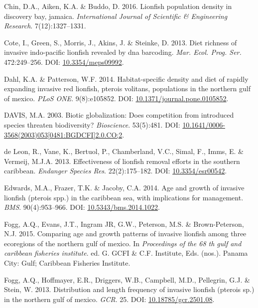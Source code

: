\documentclass[12pt,]{article}
\begin{document}
\hypertarget{ref-chin_2016}{}
Chin, D.A., Aiken, K.A. \& Buddo, D. 2016. Lionfish population density
in discovery bay, jamaica. \emph{International Journal of Scientific \&
Engineering Research}. 7(12):1327--1331.

\hypertarget{ref-cote_2013}{}
Cote, I., Green, S., Morris, J., Akins, J. \& Steinke, D. 2013. Diet
richness of invasive indo-pacific lionfish revealed by dna barcoding.
\emph{Mar. Ecol. Prog. Ser.} 472:249--256. DOI:
\href{https://doi.org/10.3354/meps09992}{10.3354/meps09992}.

\hypertarget{ref-dahl_2014}{}
Dahl, K.A. \& Patterson, W.F. 2014. Habitat-specific density and diet of
rapidly expanding invasive red lionfish, pterois volitans, populations
in the northern gulf of mexico. \emph{PLoS ONE}. 9(8):e105852. DOI:
\href{https://doi.org/10.1371/journal.pone.0105852}{10.1371/journal.pone.0105852}.

\hypertarget{ref-davis_2003}{}
DAVIS, M.A. 2003. Biotic globalization: Does competition from introduced
species threaten biodiversity? \emph{Bioscience}. 53(5):481. DOI:
\href{https://doi.org/10.1641/0006-3568(2003)053\%5B0481:BGDCFI\%5D2.0.CO;2}{10.1641/0006-3568(2003)053{[}0481:BGDCFI{]}2.0.CO;2}.

\hypertarget{ref-deleon_2013}{}
de Leon, R., Vane, K., Bertuol, P., Chamberland, V.C., Simal, F., Imms,
E. \& Vermeij, M.J.A. 2013. Effectiveness of lionfish removal efforts in
the southern caribbean. \emph{Endanger Species Res}. 22(2):175--182.
DOI: \href{https://doi.org/10.3354/esr00542}{10.3354/esr00542}.

\hypertarget{ref-edwards_2014}{}
Edwards, M.A., Frazer, T.K. \& Jacoby, C.A. 2014. Age and growth of
invasive lionfish (pterois spp.) in the caribbean sea, with implications
for management. \emph{BMS}. 90(4):953--966. DOI:
\href{https://doi.org/10.5343/bms.2014.1022}{10.5343/bms.2014.1022}.

\hypertarget{ref-fogg_2015}{}
Fogg, A.Q., Evans, J.T., Ingram JR, G.W., Peterson, M.S. \&
Brown-Peterson, N.J. 2015. Comparing age and growth patterns of invasive
lionfish among three ecoregions of the northern gulf of mexico. In
\emph{Proceedings of the 68 th gulf and caribbean fisheries institute}.
ed. G. GCFI \& C.F. Institute, Eds. (nos.). Panama City: Gulf; Caribbean
Fisheries Institute.

\hypertarget{ref-fogg_2013}{}
Fogg, A.Q., Hoffmayer, E.R., Driggers, W.B., Campbell, M.D., Pellegrin,
G.J. \& Stein, W. 2013. Distribution and length frequency of invasive
lionfish (pterois sp.) in the northern gulf of mexico. \emph{GCR}. 25.
DOI: \href{https://doi.org/10.18785/gcr.2501.08}{10.18785/gcr.2501.08}.
\end{document}
